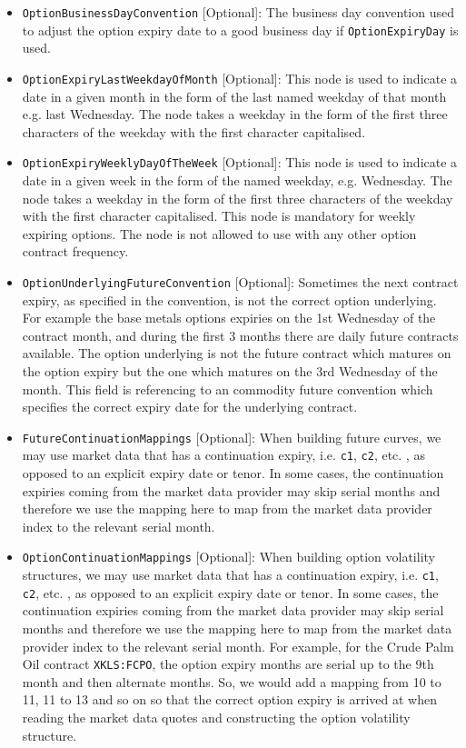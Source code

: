 \begin{itemize}
\item \lstinline!OptionBusinessDayConvention! [Optional]: The business day convention used to adjust the option expiry date to a good business day if \lstinline!OptionExpiryDay! is used.
\item \lstinline!OptionExpiryLastWeekdayOfMonth! [Optional]: This node is used to indicate a date in a given month in the form of the last named weekday of that month e.g. last Wednesday. The node takes a weekday in the form of the first three characters of the weekday with the first character capitalised.
\item \lstinline!OptionExpiryWeeklyDayOfTheWeek! [Optional]: This node is used to indicate a date in a given week in the form of the named weekday, e.g. Wednesday. The node takes a weekday in the form of the first three characters of the weekday with the first character capitalised. This node is mandatory for weekly expiring options. The node is not allowed to use with any other option contract frequency.
\item \lstinline!OptionUnderlyingFutureConvention! [Optional]: Sometimes the next contract expiry, as specified in the convention, is not the correct option underlying. For example the base metals options expiries on the 1st Wednesday of the contract month, and during the first 3 months there are daily future contracts available. The option underlying is not the future contract which matures on the option expiry but the one which matures on the 3rd Wednesday of the month. This field is referencing to an commodity future convention which specifies the correct expiry date for the underlying contract.
\item \lstinline!FutureContinuationMappings! [Optional]: When building future curves, we may use market data that has a continuation expiry, i.e. \lstinline!c1!, \lstinline!c2!, etc. , as opposed to an explicit expiry date or tenor. In some cases, the continuation expiries coming from the market data provider may skip serial months and therefore we use the mapping here to map from the market data provider index to the relevant serial month.
\item \lstinline!OptionContinuationMappings! [Optional]: When building option volatility structures, we may use market data that has a continuation expiry, i.e. \lstinline!c1!, \lstinline!c2!, etc. , as opposed to an explicit expiry date or tenor. In some cases, the continuation expiries coming from the market data provider may skip serial months and therefore we use the mapping here to map from the market data provider index to the relevant serial month. For example, for the Crude Palm Oil contract \lstinline!XKLS:FCPO!, the option expiry months are serial up to the 9th month and then alternate months. So, we would add a mapping from 10 to 11, 11 to 13 and so on so that the correct option expiry is arrived at when reading the market data quotes and constructing the option volatility structure.

\end{itemize}
